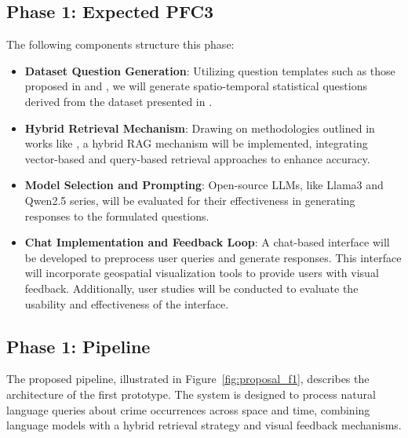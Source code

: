 

\subsection{Phase 1: Expected PFC3}

The following components structure this phase:

\begin{itemize}
    \item \textbf{Dataset Question Generation}: Utilizing question templates such as those proposed in \cite{Contractor2020QATourism} and \cite{Dai2024QASTKG}, we will generate spatio-temporal statistical questions derived from the dataset presented in \cite{Zhang2025CrimeDatasetChina}.
    \item \textbf{Hybrid Retrieval Mechanism}: Drawing on methodologies outlined in works like \cite{Guo2024LightRAG}, a hybrid RAG mechanism will be implemented, integrating vector-based and query-based retrieval approaches to enhance accuracy.
    \item \textbf{Model Selection and Prompting}: Open-source LLMs, like Llama3 \cite{Grattafiori2024Llama3} and Qwen2.5 \cite{Qwen2025Qwen2.5} series, will be evaluated for their effectiveness in generating responses to the formulated questions.
    \item \textbf{Chat Implementation and Feedback Loop}: A chat-based interface will be developed to preprocess user queries and generate responses. This interface will incorporate geospatial visualization tools to provide users with visual feedback. Additionally, user studies will be conducted to evaluate the usability and effectiveness of the interface.
\end{itemize}



\subsection{Phase 1: Pipeline}

The proposed pipeline, illustrated in Figure~\ref{fig:proposal_f1}, describes the architecture of the first prototype. The system is designed to process natural language queries about crime occurrences across space and time, combining language models with a hybrid retrieval strategy and visual feedback mechanisms.

